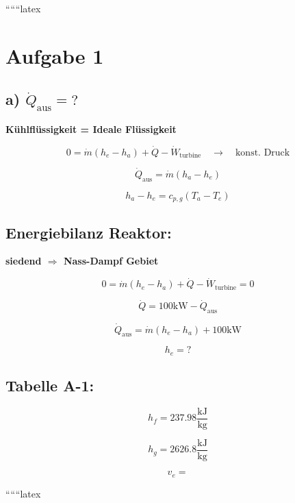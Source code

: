
``````latex


\section*{Aufgabe 1}
\subsection*{a) $\dot{Q}_{\text{aus}} = ?$}

\textbf{Kühlflüssigkeit = Ideale Flüssigkeit}

\[
0 = \dot{m} (h_e - h_a) + \dot{Q} - \dot{W}_{\text{turbine}} \quad \rightarrow \quad \text{konst. Druck}
\]

\[
\dot{Q}_{\text{aus}} = \dot{m} (h_a - h_e)
\]

\[
h_a - h_e = c_{p,g} (T_a - T_e)
\]

\subsection*{Energiebilanz Reaktor:}

\textbf{siedend $\Rightarrow$ Nass-Dampf Gebiet}

\[
0 = \dot{m} (h_e - h_a) + \dot{Q} - \dot{W}_{\text{turbine}} = 0
\]

\[
\dot{Q} = 100 \text{kW} - \dot{Q}_{\text{aus}}
\]

\[
\dot{Q}_{\text{aus}} = \dot{m} (h_e - h_a) + 100 \text{kW}
\]

\[
h_e = ?
\]

\subsection*{Tabelle A-1:}

\[
h_f = 237.98 \frac{\text{kJ}}{\text{kg}}
\]

\[
h_g = 2626.8 \frac{\text{kJ}}{\text{kg}}
\]

\[
v_e = 
\]

``````latex



